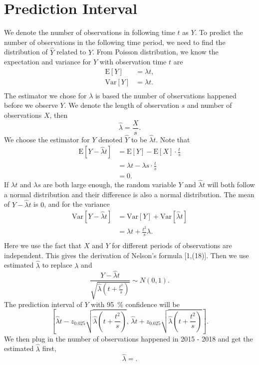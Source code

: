 \documentclass[11pt,a4paper,english]{article}
\begin{document}
\section{Prediction Interval}
We denote the number of observations in following time $t$ as $Y$.
To predict the number of observations in the following time period, we need to find the distribution of $\hat{Y}$ related to $Y$. 
From Poisson distribution, we know the expectation and variance for $Y$ with observation time $t$ are
\begin{align*}
	\text{E}[Y] &= \lambda t,\\
	\text{Var}[Y] &= \lambda t.\\
\end{align*}
The estimator we chose for $\lambda$ is based the number of observations happened before we observe $Y$.
We denote the length of observation $s$ and number of observations $X$, then
\begin{equation*}
	\hat{\lambda} = \frac{X}{s}.
\end{equation*}
We choose the estimator for $Y$ denoted $\hat{Y}$ to be $\hat{\lambda}t$.
Note that
\begin{align*}
	\text{E}[Y-\hat{\lambda}t] &= \text{E}[Y]-\text{E}[X]\cdot\frac{t}{s}\\
	&= \lambda t-\lambda s \cdot \frac{t}{s}\\
	&= 0.
\end{align*}
If $\lambda t$ and $\lambda s$ are both large enough, the random variable $Y$ and $\hat{\lambda}t$ will both follow a normal distribution and their difference is also a normal distribution.
The mean of $Y-\hat{\lambda}t$ is $0$, and for the variance
\begin{align*}
	\text{Var}[Y-\hat{\lambda}t] &= \text{Var}[Y]+\text{Var}[\hat{\lambda}t]\\
	&= \lambda t+\frac{t^{2}}{s}\lambda.\\
\end{align*}
Here we use the fact that $X$ and $Y$ for different periods of observations are independent.
This gives the derivation of Nelson's formula [1,(18)].
Then we use estimated $\hat{\lambda}$ to replace $\lambda$ and 
\begin{equation*}
	\frac{Y-\hat{\lambda}t}{\sqrt{\hat{\lambda}\left(t+\frac{t^{2}}{s}\right)}} \sim N(0,1).
\end{equation*}
The prediction interval of $Y$ with \SI{95}{\percent} confidence will be 
\begin{equation*}
	\left[
	\hat{\lambda}t-z_{0.025}\sqrt{\hat{\lambda}\left(t+\frac{t^{2}}{s}\right)},
	\,
	\hat{\lambda}t+z_{0.025}\sqrt{\hat{\lambda}\left(t+\frac{t^{2}}{s}\right)}
	\right].
\end{equation*}
We then plug in the number of observations happened in 2015 - 2018 and get the estimated $\hat{\lambda}$ first,
\[\hat{\lambda} = .\]
\end{document}
